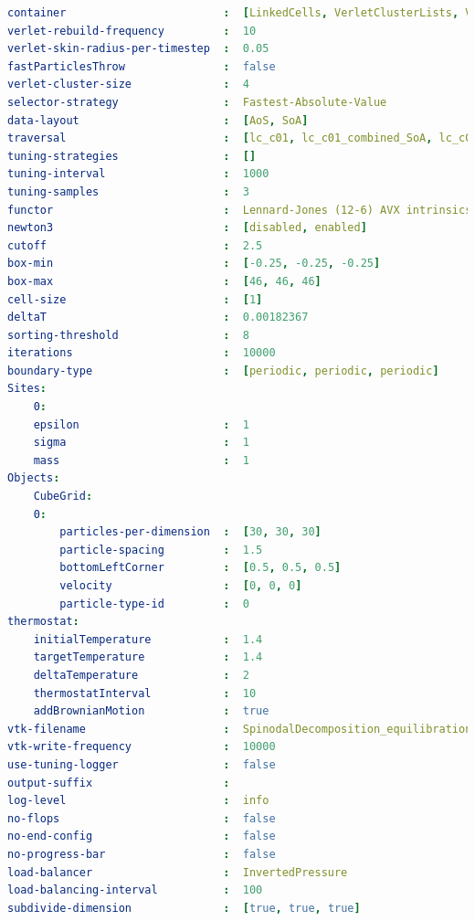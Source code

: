 \begin{lstlisting}[language=yaml,basicstyle=\tiny,breaklines=true,  caption={spinodalDecompositionEquilibration.yaml}, label={lst:spinodalDecompositionEquilibration}]
container                        :  [LinkedCells, VerletClusterLists, VerletLists, VerletListsCells, PairwiseVerletLists]
verlet-rebuild-frequency         :  10
verlet-skin-radius-per-timestep  :  0.05
fastParticlesThrow               :  false
verlet-cluster-size              :  4
selector-strategy                :  Fastest-Absolute-Value
data-layout                      :  [AoS, SoA]
traversal                        :  [lc_c01, lc_c01_combined_SoA, lc_c04, lc_c04_HCP, lc_c04_combined_SoA, lc_c08, lc_c18, lc_sliced, lc_sliced_balanced, lc_sliced_c02, ot_c01, ot_c18, vcl_c01_balanced, vcl_c06, vcl_sliced, vcl_sliced_balanced, vcl_sliced_c02, vl_list_iteration, vlc_c01, vlc_c18, vlc_sliced, vlc_sliced_balanced, vlc_sliced_c02, vlp_c01, vlp_c18, vlp_sliced, vlp_sliced_balanced, vlp_sliced_c02, vlp_c08, vvl_as_built]
tuning-strategies                :  []
tuning-interval                  :  1000
tuning-samples                   :  3
functor                          :  Lennard-Jones (12-6) AVX intrinsics
newton3                          :  [disabled, enabled]
cutoff                           :  2.5
box-min                          :  [-0.25, -0.25, -0.25]
box-max                          :  [46, 46, 46]
cell-size                        :  [1]
deltaT                           :  0.00182367
sorting-threshold                :  8
iterations                       :  10000
boundary-type                    :  [periodic, periodic, periodic]
Sites:                           
    0:
    epsilon                      :  1
    sigma                        :  1
    mass                         :  1
Objects:                         
    CubeGrid:
    0:  
        particles-per-dimension  :  [30, 30, 30]
        particle-spacing         :  1.5
        bottomLeftCorner         :  [0.5, 0.5, 0.5]
        velocity                 :  [0, 0, 0]
        particle-type-id         :  0
thermostat:
    initialTemperature           :  1.4
    targetTemperature            :  1.4
    deltaTemperature             :  2
    thermostatInterval           :  10
    addBrownianMotion            :  true
vtk-filename                     :  SpinodalDecomposition_equilibration
vtk-write-frequency              :  10000
use-tuning-logger                :  false
output-suffix                    :  
log-level                        :  info
no-flops                         :  false
no-end-config                    :  false
no-progress-bar                  :  false
load-balancer                    :  InvertedPressure
load-balancing-interval          :  100
subdivide-dimension              :  [true, true, true]
\end{lstlisting}

